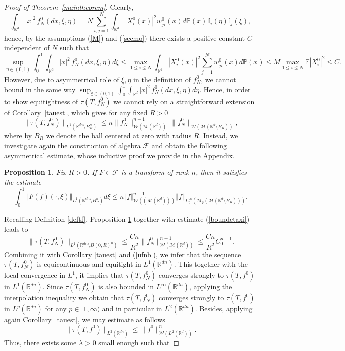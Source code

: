 \documentclass[10pt]{article}
\newtheorem{prop}{Proposition}
\newcommand{\eqq}[2]{\begin{equation}  #1  \label{#2}\end{equation}    }
\newcommand*{\norm}[1]{\left\Vert{#1}\right\Vert}
\newcommand{\R}{\mathbb{R}}
\newcommand{\izj}{\int_{0}^{1}}
\newcommand{\ird}{\int_{\mathbb{R}^d}}
\newcommand{\p}{\mathbb{P}}
\newcommand{\wji}{w_{ji}}
\newcommand{\W}{\mathcal{W}}
\newcommand{\mI}{\mathbb{I}}
\begin{document}
\begin{proof}[Proof of Theorem~\ref{maintheorem}]
Clearly, 
\[
\int_{\R^d} |x|^2\,f_N^0(dx,\xi,\eta)
= N\sum_{i,j=1}^N \ird |X^0_i(x)|^2 \wji^0(x)d\p(x) \,\mI_i(\eta)\mI_j(\xi),
\]
hence, by the assumptions (\ref{M}) and (\ref{secmo}) there exists a positive constant $C$ independent of $N$ such that
\eqq{
\sup_{\eta \in (0,1)}\int_0^1\int_{\R^d} |x|^2\,f_N^0(dx,\xi,\eta)d\xi\leq \max_{1\leq i \leq N}\ird |X^0_i(x)|^2 \sum_{j=1}^N\wji^0(x)d\p(x) \leq  M \max_{1\leq i \leq N } \mathbb{E} |X^0_i|^2 \leq C.
}{boundetaxi}
However, due to asymmetrical role of $\xi,\eta$ in the definition of $f^0_N$, we cannot bound in the same way  $\sup_{\xi \in (0,1)}\int_0^1\int_{\R^d} |x|^2\,f_N^0(dx,\xi,\eta)d\eta$.
Hence, in order to show equitightness of $\tau(T,f^0_N)$ we cannot rely on  a straightforward extension of Corollary~\ref{tauest}, which gives for any fixed $R>0$
\[
\|\tau(T,f^0_N)\|_{L^1(\R^{dn}\setminus B_R^{n})}\leq n \|f^0_N\|_{\W( \mathcal{M}(\R^{d}))}^{n-1}\,\|f^0_N\|_{\W( \mathcal{M}(\R^{d}\setminus B_R))},
\]
where by $B_R$ we denote the ball centered at zero with radius $R$.
Instead, we investigate again the construction of algebra $\mathcal{F}$ and obtain the following asymmetrical estimate, whose inductive proof we provide in the Appendix.
\begin{prop}\label{asym}
Fix $R>0$. If $F \in \mathcal{F}$ is a transform of rank $n$, then it satisfies the estimate
\[
\izj \norm{F(f)(\cdot,\xi)}_{L^{1}(\R^{dn}\setminus B_R^n)}d\xi \leq n \norm{f}^{n-1}_{\W((\mathcal{M}(\R^d)))} \norm{f}_{L^{\infty}_{\eta}(\mathcal{M}_\xi(\mathcal{M}(\R^d \setminus B_R)))}.
\]
\end{prop}
Recalling Definition \ref{deftf}, Proposition \ref{asym} together with estimate (\ref{boundetaxi}) leads to
\[
\|\tau(T,f^0_N)\|_{L^1(\R^{dn}\setminus B(0,R)^{n})}\leq \frac{Cn}{R^2}\|f^0_N\|_{\W( \mathcal{M}(\R^{d}))}^{n-1} \leq \frac{Cn}{R^2}C_0^{n-1}.
\]
Combining it with Corollary \ref{tauest} and (\ref{ufnb}), we infer that the sequence $\tau(T,f^0_N)$ is equicontinuous and equitight in $L^{1}(\R^{dn})$.
This together with the local convergence in $L^1$, it implies that $\tau(T,f_N^0)$ converges strongly to $\tau(T,f^0)$ in  $L^1(\R^{dn})$. Since $\tau(T,f_N^0)$ is also bounded in $L^{\infty}(\R^{dn})$, applying the interpolation inequality we obtain that $\tau(T,f_N^0)$ converges strongly to $\tau(T,f^0)$ in $L^p(\R^{dn})$ for any $p\in [1,\infty)$ and in particular in $L^2(\R^{dn})$.
Besides, applying again Corollary~\ref{tauest}, we may estimate as follows
\[
\|\tau(T,f^0)\|_{L^2(\R^{dn})}\leq \|f^0\|_{\W( L^2(\R^d))}^{n}.
\]
Thus, there exists some $\lambda>0$ small enough such that

\end{proof}
\end{document}
